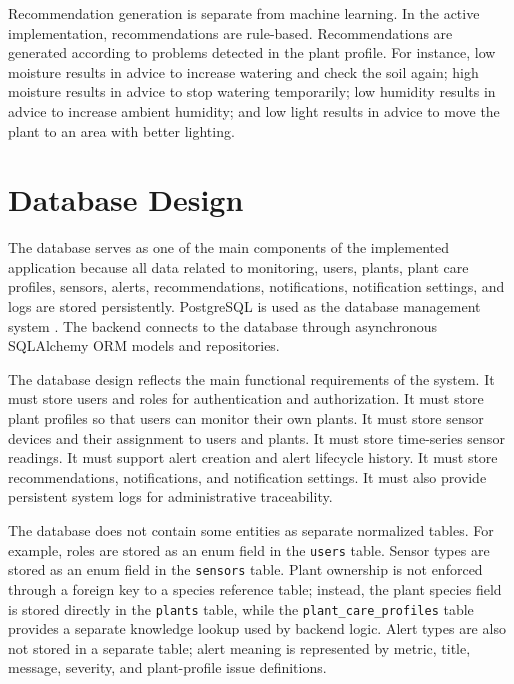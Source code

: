 Recommendation generation is separate from machine learning. In the active implementation, recommendations are rule-based. Recommendations are generated according to problems detected in the plant profile. For instance, low moisture results in advice to increase watering and check the soil again; high moisture results in advice to stop watering temporarily; low humidity results in advice to increase ambient humidity; and low light results in advice to move the plant to an area with better lighting.



\section{Database Design}
\label{sec:database-design}

The database serves as one of the main components of the implemented application because all data related to monitoring, users, plants, plant care profiles, sensors, alerts, recommendations, notifications, notification settings, and logs are stored persistently. PostgreSQL is used as the database management system \cite{postgresql2025docs}. The backend connects to the database through asynchronous SQLAlchemy ORM models and repositories.

The database design reflects the main functional requirements of the system. It must store users and roles for authentication and authorization. It must store plant profiles so that users can monitor their own plants. It must store sensor devices and their assignment to users and plants. It must store time-series sensor readings. It must support alert creation and alert lifecycle history. It must store recommendations, notifications, and notification settings. It must also provide persistent system logs for administrative traceability.

The database does not contain some entities as separate normalized tables. For example, roles are stored as an enum field in the \texttt{users} table. Sensor types are stored as an enum field in the \texttt{sensors} table. Plant ownership is not enforced through a foreign key to a species reference table; instead, the plant species field is stored directly in the \texttt{plants} table, while the \texttt{plant\_care\_profiles} table provides a separate knowledge lookup used by backend logic. Alert types are also not stored in a separate table; alert meaning is represented by metric, title, message, severity, and plant-profile issue definitions.


